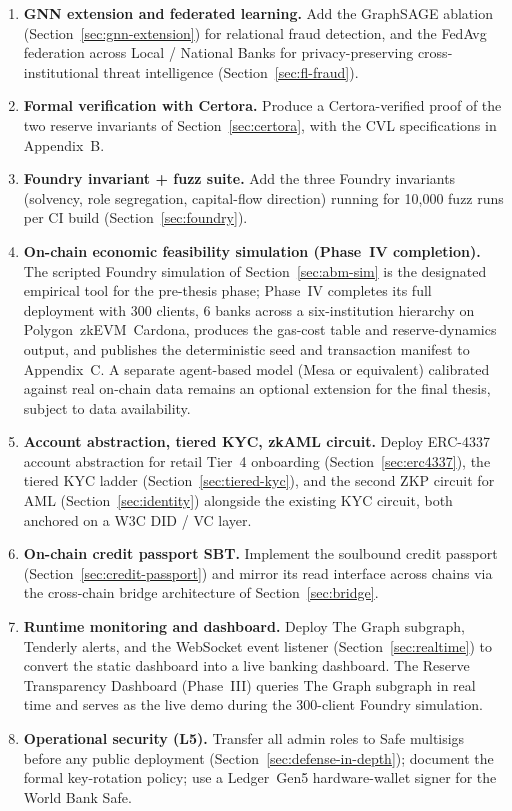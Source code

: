\documentclass[12pt,a4paper]{report}
\begin{document}
\begin{enumerate}[noitemsep]
\item \textbf{GNN extension and federated learning.} Add the GraphSAGE ablation (Section~\ref{sec:gnn-extension}) for relational fraud detection, and the FedAvg federation across Local / National Banks for privacy-preserving cross-institutional threat intelligence (Section~\ref{sec:fl-fraud}).
\item \textbf{Formal verification with Certora.} Produce a Certora-verified proof of the two reserve invariants of Section~\ref{sec:certora}, with the CVL specifications in Appendix~B.
\item \textbf{Foundry invariant + fuzz suite.} Add the three Foundry invariants (solvency, role segregation, capital-flow direction) running for 10{,}000 fuzz runs per CI build (Section~\ref{sec:foundry}).
\item \textbf{On-chain economic feasibility simulation (Phase~IV completion).} The scripted Foundry simulation of Section~\ref{sec:abm-sim} is the designated empirical tool for the pre-thesis phase; Phase~IV completes its full deployment with 300 clients, 6 banks across a six-institution hierarchy on Polygon~zkEVM~Cardona, produces the gas-cost table and reserve-dynamics output, and publishes the deterministic seed and transaction manifest to Appendix~C. A separate agent-based model (Mesa or equivalent) calibrated against real on-chain data remains an optional extension for the final thesis, subject to data availability.
\item \textbf{Account abstraction, tiered KYC, zkAML circuit.} Deploy ERC-4337 account abstraction for retail Tier~4 onboarding (Section~\ref{sec:erc4337}), the tiered KYC ladder (Section~\ref{sec:tiered-kyc}), and the second ZKP circuit for AML (Section~\ref{sec:identity}) alongside the existing KYC circuit, both anchored on a W3C DID / VC layer.
\item \textbf{On-chain credit passport SBT.} Implement the soulbound credit passport (Section~\ref{sec:credit-passport}) and mirror its read interface across chains via the cross-chain bridge architecture of Section~\ref{sec:bridge}.
\item \textbf{Runtime monitoring and dashboard.} Deploy The Graph subgraph, Tenderly alerts, and the WebSocket event listener (Section~\ref{sec:realtime}) to convert the static dashboard into a live banking dashboard. The Reserve Transparency Dashboard (Phase~III) queries The Graph subgraph in real time and serves as the live demo during the 300-client Foundry simulation.
\item \textbf{Operational security (L5).} Transfer all admin roles to Safe multisigs before any public deployment (Section~\ref{sec:defense-in-depth}); document the formal key-rotation policy; use a Ledger~Gen5 hardware-wallet signer for the World Bank Safe.

\end{enumerate}
\end{document}
